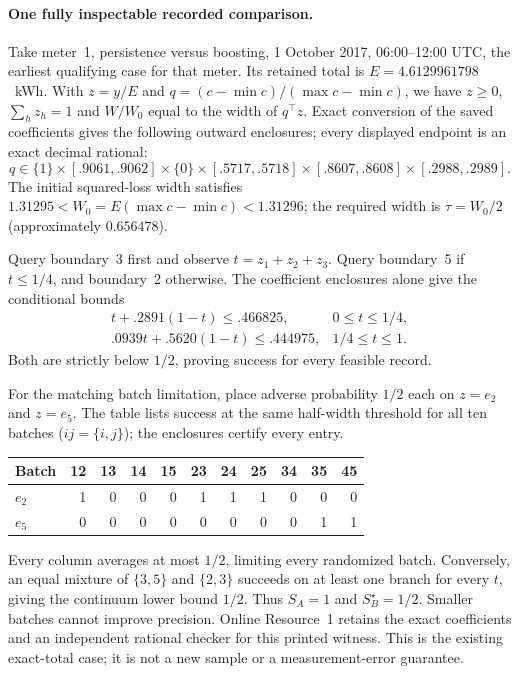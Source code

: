 \documentclass[12pt]{article}
\begin{document}
\paragraph{One fully inspectable recorded comparison.}\label{sec:worked-counter-example}
Take meter~1, persistence versus boosting, 1 October 2017, 06:00--12:00
UTC, the earliest qualifying case for that meter. Its retained total is
$E=4.6129961798$~kWh. With $z=y/E$ and
$q=(c-\min c)/(\max c-\min c)$, we have $z\geq0$, $\sum_hz_h=1$ and
$W/W_0$ equal to the width of $q^\top z$. Exact conversion of the saved
coefficients gives the following outward enclosures; every displayed
endpoint is an exact decimal rational:
\[
q\in\{1\}\times[.9061,.9062]\times\{0\}
\times[.5717,.5718]\times[.8607,.8608]\times[.2988,.2989].
\]
The initial squared-loss width satisfies
$1.31295<W_0=E(\max c-\min c)<1.31296$; the required width is
$\tau=W_0/2$ (approximately $0.656478$).

Query boundary~3 first and observe $t=z_1+z_2+z_3$.
Query boundary~5 if $t\leq1/4$, and boundary~2 otherwise.
The coefficient enclosures alone give the conditional bounds
\[
\begin{array}{ll}
t+.2891(1-t)\leq .466825,&0\leq t\leq1/4,\\
.0939t+.5620(1-t)\leq .444975,&1/4\leq t\leq1.
\end{array}
\]
Both are strictly below $1/2$, proving success for every feasible record.

For the matching batch limitation, place adverse probability $1/2$ each on
$z=e_2$ and $z=e_5$. The table lists success at the same half-width threshold
for all ten batches ($ij=\{i,j\}$); the enclosures certify every entry.
\begin{center}\small
\begin{tabular}{lrrrrrrrrrr}\toprule
Batch &12&13&14&15&23&24&25&34&35&45\\\midrule
$e_2$ &1&0&0&0&1&1&1&0&0&0\\
$e_5$ &0&0&0&0&0&0&0&0&1&1\\\bottomrule
\end{tabular}
\end{center}
Every column averages at most $1/2$, limiting every randomized batch.
Conversely, an equal mixture of $\{3,5\}$ and $\{2,3\}$ succeeds on
at least one branch for every $t$, giving the continuum lower bound $1/2$.
Thus $S_A=1$ and $S_B^\star=1/2$. Smaller batches cannot improve precision.
Online Resource~1 retains the exact coefficients and an independent
rational checker for this printed witness. This is the existing exact-total
case; it is not a new sample or a measurement-error guarantee.
\end{document}
